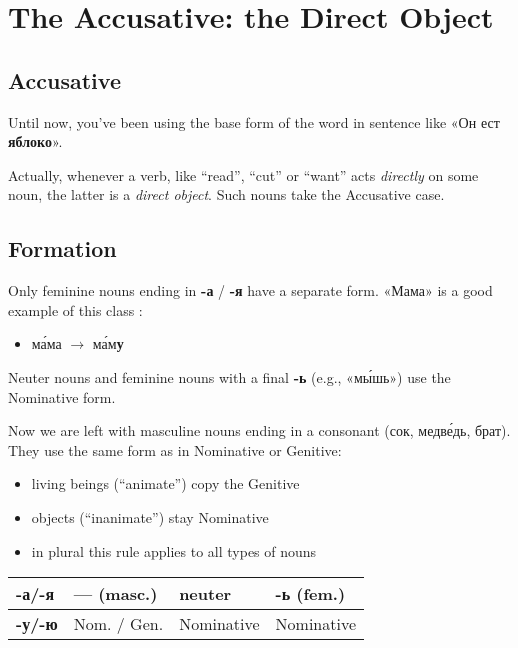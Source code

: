 \chapter{The Accusative: the Direct
Object}\label{the-accusative-the-direct-object}

\section{Accusative}\label{accusative}

Until now, you've been using the base form of the word in sentence like
«Он ест \textbf{яблоко}».

Actually, whenever a verb, like ``read'', ``cut'' or ``want'' acts
\emph{directly} on some noun, the latter is a \emph{direct object}. Such
nouns take the Accusative case.

\section{Formation}\label{formation}

Only feminine nouns ending in \textbf{-а} / \textbf{-я} have a separate
form. «Мама» is a good example of this class :

\begin{itemize}
\tightlist
\item
  м\'{а}ма $ \rightarrow$ м\'{а}м\textbf{у}
\end{itemize}

Neuter nouns and feminine nouns with a final \textbf{-ь} (e.g., «м\'{ы}шь»)
use the Nominative form.

Now we are left with masculine nouns ending in a consonant (сок,
медв\'{е}дь, брат). They use the same form as in Nominative or Genitive:

\begin{itemize}
\tightlist
\item
  living beings (``animate'') copy the Genitive
\item
  objects (``inanimate'') stay Nominative
\item
  in plural this rule applies to all types of nouns
\end{itemize}

\begin{longtable}[]{@{}llll@{}}
\toprule
\textbf{-а/-я} & \textbf{---} (masc.) & \textbf{neuter} & \textbf{-ь}
(fem.)\tabularnewline
\midrule
\endhead
\textbf{-у/-ю} & Nom. / Gen. & Nominative & Nominative\tabularnewline
\bottomrule
\end{longtable}

